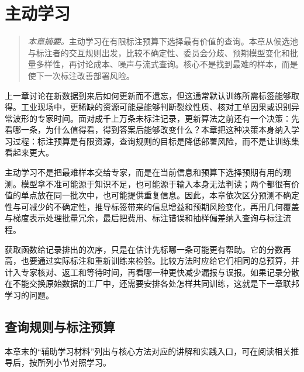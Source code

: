 \chapter{主动学习}
\label{chap:active}
\begin{quote}\small
\textit{本章摘要。}主动学习在有限标注预算下选择最有价值的查询。本章从候选池与标注者的交互规则出发，比较不确定性、委员会分歧、预期模型变化和批量多样性，再讨论成本、噪声与流式查询。核心不是找到最难的样本，而是使下一次标注改善部署风险。
\end{quote}

上一章讨论在新数据到来后如何更新而不遗忘，但这通常默认训练所需标签能够取得。工业现场中，更稀缺的资源可能是能够判断裂纹性质、核对工单因果或识别异常波形的专家时间。面对成千上万条未标注记录，更新算法之前还有一个决策：先看哪一条，为什么值得看，得到答案后能够改变什么？本章把这种决策本身纳入学习过程：标注预算是有限资源，查询规则的目标是降低部署风险，而不是让训练集看起来更大。

主动学习不是把最难样本交给专家，而是在当前信息和预算下选择预期有用的观测。模型拿不准可能源于知识不足，也可能源于输入本身无法判读；两个都很有价值的单点放在同一批次中，也可能提供重复信息。因此，本章依次区分预测不确定性与可减少的不确定性，推导标签带来的信息增益和预期风险变化，再用几何覆盖与梯度表示处理批量冗余，最后把费用、标注错误和抽样偏差纳入查询与标注流程。

获取函数给记录排出的次序，只是在估计先标哪一条可能更有帮助。它的分数再高，也要通过实际标注和重新训练来检验。比较方法时应给它们相同的总预算，并计入专家核对、返工和等待时间，再看哪一种更快减少漏报与误报。如果记录分散在不能交换原始数据的工厂中，还需要安排各处怎样共同训练，这就是下一章联邦学习的问题。

\section{查询规则与标注预算}

本章末的“辅助学习材料”列出与核心方法对应的讲解和实践入口，可在阅读相关推导后，按所列小节对照学习。

